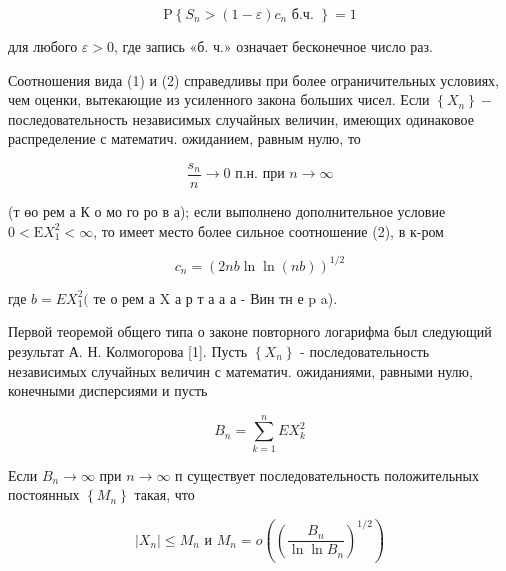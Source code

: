 \documentclass[10pt]{article}
\begin{document}
\[

\mathrm{P}\left\{S_{n}>(1-\varepsilon) c_{n} \text { б.ч. }\right\}=1

\]



для любого $\varepsilon>0$, где запись «б. ч.» означает бесконечное число раз.



Соотношения вида (1) и (2) справедливы при более ограничительных условиях, чем оценки, вытекающие из усиленного закона больших чисел. Если $\left\{X_{n}\right\}-$ последовательность независимых случайных величин, имеющих одинаковое распределение с математич. ожиданием, равным нулю, то



\[

\frac{s_{n}}{n} \rightarrow 0 \text { п.н. при } n \rightarrow \infty

\]



(т өо рем а К о мо го ро в а); если выполнено дополнительное условие $0<\mathrm{E} X_{1}^{2}<\infty$, то имеет место более сильное соотношение (2), в к-ром



\[

c_{n}=(2 n b \ln \ln (n b))^{1 / 2}

\]



где $b=E X_{1}^{2}($ те о рем а X а р т а а а - Вин тн е p a).



Первой теоремой общего типа о законе повторного логарифма был следующий результат А. Н. Колмогорова [1]. Пусть $\left\{X_{n}\right\}$ - последовательность независимых случайных величин с математич. ожиданиями, равными нулю, конечными дисперсиями и пусть



\[

B_{n}=\sum_{k=1}^{n} E X_{k}^{2}

\]



Если $B_{n} \rightarrow \infty$ при $n \rightarrow \infty$ п существует последовательность положительных постоянных $\left\{M_{n}\right\}$ такая, что



\[

\left|X_{n}\right| \leqslant M_{n} \text { и } M_{n}=o\left(\left(\frac{B_{n}}{\ln \ln B_{n}}\right)^{1 / 2}\right)

\]
\end{document}
